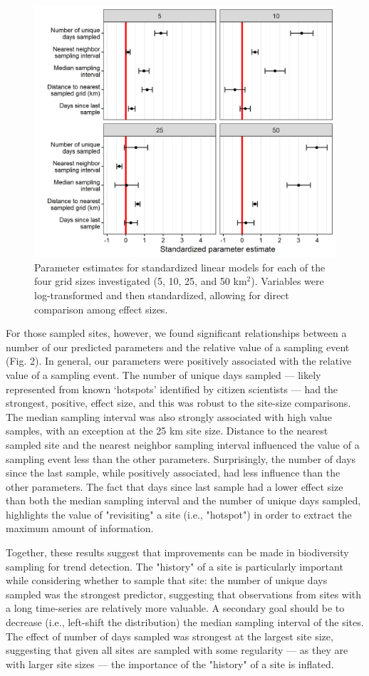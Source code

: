\documentclass[9pt,twocolumn,twoside,lineno]{pnas-new}
\begin{document}
\begin{figure}[!hb]
\centering
\includegraphics[width=.8\linewidth]{param_estimates.png}
\caption{Parameter estimates for standardized linear models for each of the four grid sizes investigated (5, 10, 25, and 50 km$^{2}$). Variables were log-transformed and then standardized, allowing for direct comparison among effect sizes.}
\label{fig2}
\end{figure}

For those sampled sites, however, we found significant relationships between a number of our predicted parameters and the relative value of a sampling event (Fig. 2). In general, our parameters were positively associated with the relative value of a sampling event. The number of unique days sampled --- likely represented from known `hotspots' identified by citizen scientists --- had the strongest, positive, effect size, and this was robust to the site-size comparisons. The median sampling interval was also strongly associated with high value samples, with an exception at the 25 km site size. Distance to the nearest sampled site and the nearest neighbor sampling interval influenced the value of a sampling event less than the other parameters. Surprisingly, the number of days since the last sample, while positively associated, had less influence than the other parameters. The fact that days since last sample had a lower effect size than both the median sampling interval and the number of unique days sampled, highlights the value of "revisiting" a site (i.e., "hotspot") in order to extract the maximum amount of information.

Together, these results suggest that improvements can be made in biodiversity sampling for trend detection. The "history" of a site is particularly important while considering whether to sample that site: the number of unique days sampled was the strongest predictor, suggesting that observations from sites with a long time-series are relatively more valuable. A secondary goal should be to decrease (i.e., left-shift the distribution) the median sampling interval of the sites. The effect of number of days sampled was strongest at the largest site size, suggesting that given all sites are sampled with some regularity --- as they are with larger site sizes --- the importance of the "history" of a site is inflated.
\end{document}

